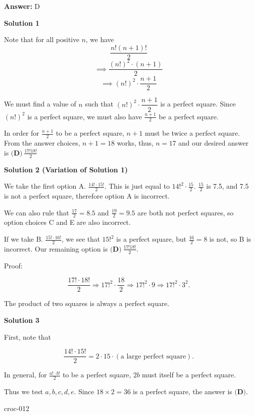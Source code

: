 \begin{enumerate}
 \textbf{Answer: }D



\textbf{Solution 1}

Note that for all positive $n$, we have 
 \[\dfrac{n!(n+1)!}{2}\]
 \[\implies\dfrac{(n!)^2\cdot(n+1)}{2}\]
 \[\implies (n!)^2\cdot\dfrac{n+1}{2}\] 

 We must find a value of $n$ such that $(n!)^2\cdot\dfrac{n+1}{2}$ is a perfect square. Since $(n!)^2$ is a perfect square, we must also have $\frac{n+1}{2}$ be a perfect square. 

 In order for $\frac{n+1}{2}$ to be a perfect square, $n+1$ must be twice a perfect square. From the answer choices, $n+1=18$ works, thus, $n=17$ and our desired answer is $\boxed{\textbf{(D)}\ \frac{17!18!}{2}}$




\textbf{Solution 2 (Variation of Solution 1)}

We take the first option A. \( \frac{14! \cdot 15!}{2} \). This is just equal to \( 14!^2 \cdot \frac{15}{2} \). \( \frac{15}{2} \) is 7.5, and 7.5 is not a perfect square, therefore option A is incorrect. 

 We can also rule that \( \frac{17}{2} = 8.5 \) and \( \frac{19}{2} = 9.5 \) are both not perfect squares, so option choices C and E are also incorrect. 

 If we take B. \( \frac{15! \cdot 16!}{2} \), we see that \( 15!^2 \) is a perfect square, but \( \frac{16}{2} = 8 \) is not, so B is incorrect. Our remaining option is $\boxed{\textbf{(D)}\ \frac{17!18!}{2}}$.

 Proof:

 
 \[\frac{17! \cdot 18!}{2} \Rightarrow 17!^2 \cdot \frac{18}{2} \Rightarrow 17!^2 \cdot 9 \Rightarrow 17!^2 \cdot 3^2.\] 

 The product of two squares is always a perfect square.

 



\textbf{Solution 3}

First, note that

 \[\frac{14!\cdot 15!}{2} = 2\cdot 15 \cdot (\text{a large perfect square}).\]

 In general, for \(\frac{a!\cdot b!}{2}\) to be a perfect square, \(2b\) must itself be a perfect square.

 Thus we test \(a,b,c,d,e\). Since \(18 \times 2 = 36\) is a perfect square, the answer is \(\boxed{\textbf{(D)}}\).

 croc-012


\end{enumerate}
